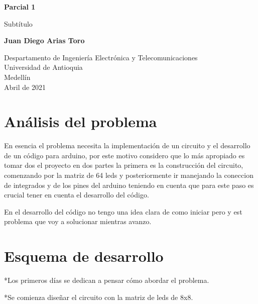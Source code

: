 \documentclass{article}
\begin{document}
\begin{titlepage}
    \begin{center}
        \vspace*{1cm}
            
        \Huge
        \textbf{Parcial 1}
            
        \vspace{0.5cm}
        \LARGE
        Subtítulo
            
        \vspace{1.5cm}
            
        \textbf{Juan Diego Arias Toro}
            
        \vfill
            
        \vspace{0.8cm}
            
        \Large
        Despartamento de Ingeniería Electrónica y Telecomunicaciones\\
        Universidad de Antioquia\\
        Medellín\\
        Abril de 2021
            
    \end{center}
\end{titlepage}

\tableofcontents
\newpage
\section{Análisis del problema}\label{intro}
En esencia el problema necesita la implementación de un circuito y el desarrollo de un código para arduino, por este motivo considero que lo más apropiado es tomar dos el proyecto en dos partes la primera es la construcción del circuito, comenzando por la matriz de 64 leds y posteriormente ir manejando la coneccion de integrados y de los pines del arduino teniendo en cuenta que para este paso es crucial tener en cuenta el desarrollo del código.

En el desarrollo del código no tengo una idea clara de como iniciar pero y est problema que voy a solucionar mientras avanzo. 


\section{Esquema de desarrollo} \label{contenido}
*Los primeros días se dedican a pensar cómo abordar el problema.

*Se comienza diseñar el circuito con la matriz de leds de 8x8.
\end{document}
